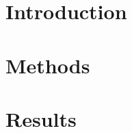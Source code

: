 \documentclass[a4paper]{article}
\begin{document}
\begin{multicols}{2}

\section{Introduction}

\newpage
\section{Methods}









 




\section{Results}





\end{multicols}
\end{document}
